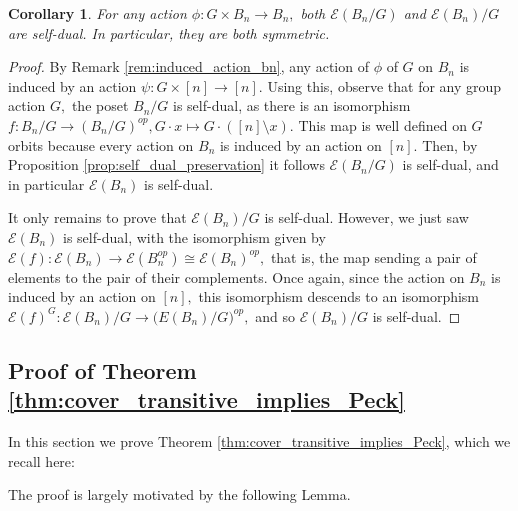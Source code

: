 \documentclass[10 pt]{amsart}
\theoremstyle{plain}
\newtheorem{cor}[thm]{Corollary}
\theoremstyle{definition}
\theoremstyle{remark}
\numberwithin{equation}{section}
\newcommand\ssec{\subsection}
\begin{document}
\begin{cor}
For any action $\phi:G \times B_n \rightarrow B_n,$ both $\mathcal E(B_n/G)$ and $\mathcal E(B_n)/G$ are self-dual. In particular, they are both symmetric. 
\end{cor}
\begin{proof}
By Remark \ref{rem:induced_action_bn}, any action of $\phi$ of $G$ on $B_n$ is induced by an action $\psi:G \times [n] \rightarrow [n].$ Using this, observe that for any group action $G,$ the poset $B_n/G$ is self-dual, as there is an isomorphism $f:B_n/G \rightarrow (B_n/G)^{op},G \cdot x \mapsto G \cdot ([n] \setminus x).$ This map is well defined on $G$ orbits because every action on $B_n$ is induced by an action on $[n].$ Then, by Proposition \ref{prop:self_dual_preservation} it follows $\mathcal E(B_n/G)$ is self-dual, and in particular $\mathcal E(B_n)$ is self-dual.

It only remains to prove that $\mathcal E(B_n)/G$ is self-dual. However, we just saw $\mathcal E(B_n)$ is self-dual, with the isomorphism given by $\mathcal E(f):\mathcal E(B_n) \rightarrow \mathcal E(B_n^{op})\cong \mathcal E(B_n)^{op},$ that is, the map sending a pair of elements to the pair of their complements. Once again, since the action on $B_n$ is induced by an action on $[n],$ this isomorphism descends to an isomorphism $\mathcal E(f)^G:\mathcal E(B_n)/G \rightarrow \mathcal (E(B_n)/G)^{op},$ and so $\mathcal E(B_n)/G$ is self-dual.
\end{proof}


\ssec{Proof of Theorem \ref{thm:cover_transitive_implies_Peck}}\label{ssec:proof_of_cover_transitive_implies_Peck}

In this section we prove Theorem \ref{thm:cover_transitive_implies_Peck}, which we recall here:

\cctpeck*

The proof is largely motivated by the following Lemma.
\end{document}
